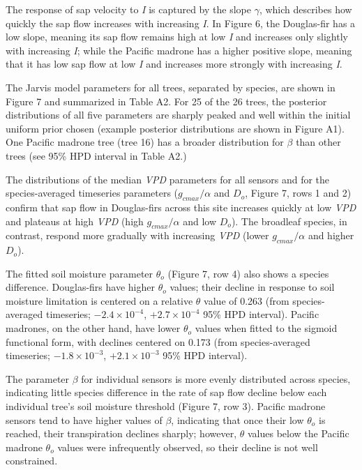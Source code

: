 The response of sap velocity to \textit{I} is captured by the slope $\gamma$, which describes how quickly the sap flow increases with increasing \textit{I}.  In Figure 6, the Douglas-fir has a low slope, meaning its sap flow remains high at low \textit{I} and increases only slightly with increasing \textit{I}; while the Pacific madrone has a higher positive slope, meaning that it has low sap flow at low \textit{I} and increases more strongly with increasing \textit{I}.

The Jarvis model parameters for all trees, separated by species, are shown in Figure 7 and summarized in Table A2.  For 25 of the 26 trees, the posterior distributions of all five parameters are sharply peaked and well within the initial uniform prior chosen (example posterior distributions are shown in Figure A1).  One Pacific madrone tree (tree 16) has a broader distribution for $\beta$ than other trees (see 95\% HPD interval in Table A2.)

The distributions of the median \textit{VPD} parameters for all sensors and for the species-averaged timeseries parameters ($g_{cmax}/\alpha$ and $D_o$, Figure 7, rows 1 and 2) confirm that sap flow in Douglas-firs across this site increases quickly at low \textit{VPD} and plateaus at high \textit{VPD} (high $g_{cmax}/\alpha$ and low $D_o$).  The broadleaf species, in contrast, respond more gradually with increasing \textit{VPD} (lower $g_{cmax}/\alpha$ and higher $D_o$).

The fitted soil moisture parameter $\theta_o$ (Figure 7, row 4) also shows a species difference.  Douglas-firs have higher $\theta_o$ values; their decline in response to soil moisture limitation is centered on a relative $\theta$ value of 0.263 (from species-averaged timeseries;  $-2.4 \times 10^{-4}$, $+2.7 \times 10^{-4}$ 95\% HPD interval).  Pacific madrones, on the other hand, have lower $\theta_o$ values when fitted to the sigmoid functional form, with declines centered on 0.173 (from species-averaged timeseries; $-1.8 \times 10^{-3}$, $+2.1 \times 10^{-3}$ 95\% HPD interval).

The parameter $\beta$ for individual sensors is more evenly distributed across species, indicating little species difference in the rate of sap flow decline below each individual tree's soil moisture threshold (Figure 7, row 3).  Pacific madrone sensors tend to have higher values of $\beta$, indicating that once their low $\theta_o$ is reached, their transpiration declines sharply; however, $\theta$ values below the Pacific madrone $\theta_o$ values were infrequently observed, so their decline is not well constrained.

